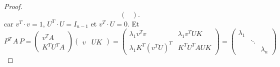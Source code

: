\begin{proof}
\begin{displaymath}
\begin{pmatrix}
  \end{pmatrix}. 
\end{displaymath}
car $v^T \cdot v = 1$, $U^T \cdot U = I_{n-1}$ et $v^T \cdot U = 0$. Et 
\begin{displaymath}
  P^T \, A \, P =
  \begin{pmatrix}
    v^T A \\
    K^T U^T A 
  \end{pmatrix}
  \begin{pmatrix}
    v & U K
  \end{pmatrix} =
  \begin{pmatrix}
    \lambda_1 v^T v & \lambda_1 v^T U K \\
    \lambda_1 K^T (v^T U)^T & K^T U^T A U K
  \end{pmatrix} =
  \begin{pmatrix}
    \lambda_1 \\
    & \ddots \\
    && \lambda_n
  \end{pmatrix}  
\end{displaymath}
\end{proof}






